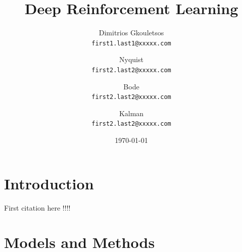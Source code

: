 \documentclass[12pt,oneside]{article}
\title{\Huge\textbf{Deep Reinforcement Learning}}
\author{
  Dimitrios Gkouletsos\\
  \texttt{first1.last1@xxxxx.com}
  \and
  Nyquist\\
  \texttt{first2.last2@xxxxx.com}
  \and
  Bode\\
  \texttt{first2.last2@xxxxx.com}
  \and
  Kalman\\
  \texttt{first2.last2@xxxxx.com}
}
\date{\today}
\begin{document}
\maketitle

\section{Introduction}
	First citation here \cite{sutton} !!!!
	
\section{Models and Methods}

\end{document}
